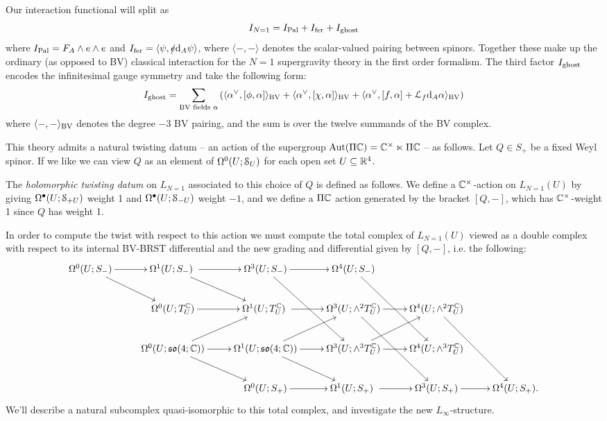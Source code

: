 \documentclass[10pt, oneside]{article}
\def\d{{\rm d}}
\begin{document}
\begin{definition}
Our interaction functional will split as
\[I_{N=1} = I_{\mathrm{Pal}} + I_{\mathrm{fer}} + I_{\mathrm{ghost}}\]
where $I_{\mathrm{Pal}} = F_A \wedge e \wedge e$ and $I_{\mr{fer}} = \langle \psi, \sd e \d_A \psi \rangle$, where $\langle -,- \rangle$ denotes the scalar-valued pairing between spinors.  Together these make up the ordinary (as opposed to BV) classical interaction for the $N=1$ supergravity theory in the first order formalism.  The third factor $I_{\mathrm{ghost}}$ encodes the infinitesimal gauge symmetry and take the following form:
\[
I_{\mr{ghost}} = \sum_{\text{BV fields } \alpha}  \left( \langle \alpha^\vee, [\phi, \alpha]\rangle_{\mr{BV}} + \langle \alpha^\vee, [\chi, \alpha]\rangle_{\mr{BV}} + \langle \alpha^\vee, [f, \alpha] + \mc L_f \d_A \alpha \rangle_{\mr{BV}} \right)
\]
where $\langle -,-\rangle_{\mathrm{BV}}$ denotes the degree $-3$ BV pairing, and the sum is over the twelve summands of the BV complex.
\end{definition}

This theory admits a natural twisting datum -- an action of the supergroup $\operatorname{Aut}(\Pi \mathbb{C}) = \mathbb{C}^\times \ltimes \Pi \mathbb{C}$ -- as follows.  Let $Q \in S_+$ be a fixed Weyl spinor.  If we like we can view $Q$ as an element of $\Omega^0(U; \mathcal{S}_U)$ for each open set $U \subseteq \mathbb{R}^4$.
\begin{definition}
The \emph{holomorphic twisting datum} on $L_{N=1}$ associated to this choice of $Q$ is defined as follows.  We define a $\mathbb{C}^\times$-action on $L_{N=1}(U)$ by giving $\Omega^\bullet(U; \mathcal{S}_{+U})$ weight 1 and $\Omega^\bullet(U; \mathcal{S}_{-U})$ weight $-1$, and we define a $\Pi \mathbb{C}$ action generated by the bracket $[Q,-]$, which has $\mathbb{C}^\times$-weight 1 since $Q$ has weight 1.
\end{definition}

In order to compute the twist with respect to this action we must compute the total complex of $L_{N=1}(U)$ viewed as a double complex with respect to its internal BV-BRST differential and the new grading and differential given by $[Q,-]$, i.e. the following:
\begin{equation} \xymatrix{
   \Omega^0(U; S_-) \ar[r] \ar[rd] & \Omega^1(U; S_-) \ar[r]\ \ar[rd] &\Omega^3(U; S_-) \ar[r] \ar[rdd] &\Omega^4(U; S_-) \ar[rdd] \\
   &\Omega^0(U; T^\CC_U) \ar[r] & \Omega^1(U; T^\CC_U) \ar[r]\ &\Omega^3(U; \wedge^2 T^\CC_U) \ar[r] \ar[rdd] &\Omega^4(U; \wedge^2 T^\CC_U) \ar[rdd] \\
   &\Omega^0(U; \so(4;\CC)) \ar[r] \ar[rd] \ar[ur] & \Omega^1(U; \so(4;\CC)) \ar[r] \ar[ru] \ar[rd] &\Omega^3(U; \wedge^3 T^\CC_U) \ar[r] \ar[ur] &\Omega^4(U; \wedge^3 T^\CC_U) \\ 
   &&\Omega^0(U; S_+) \ar[r] & \Omega^1(U; S_+) \ar[r]\ &\Omega^3(U; S_+) \ar[r] &\Omega^4(U; S_+). \\
}\label{twisted_complex}\end{equation}
We'll describe a natural subcomplex quasi-isomorphic to this total complex, and investigate the new $L_\infty$-structure.
\end{document}
